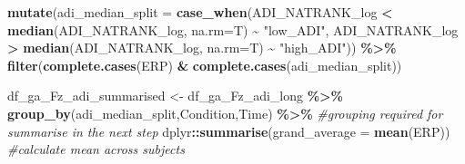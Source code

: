\documentclass[
]{article}
\newenvironment{Shaded}{\begin{snugshade}}{\end{snugshade}}
\newcommand{\AttributeTok}[1]{\textcolor[rgb]{0.13,0.29,0.53}{#1}}
\newcommand{\CommentTok}[1]{\textcolor[rgb]{0.56,0.35,0.01}{\textit{#1}}}
\newcommand{\FunctionTok}[1]{\textcolor[rgb]{0.13,0.29,0.53}{\textbf{#1}}}
\newcommand{\NormalTok}[1]{#1}
\newcommand{\OtherTok}[1]{\textcolor[rgb]{0.56,0.35,0.01}{#1}}
\newcommand{\SpecialCharTok}[1]{\textcolor[rgb]{0.81,0.36,0.00}{\textbf{#1}}}
\newcommand{\StringTok}[1]{\textcolor[rgb]{0.31,0.60,0.02}{#1}}
\begin{document}
\begin{Shaded}
\begin{Highlighting}[]
  \FunctionTok{mutate}\NormalTok{(}\AttributeTok{adi\_median\_split =} \FunctionTok{case\_when}\NormalTok{(ADI\_NATRANK\_log }\SpecialCharTok{\textless{}} \FunctionTok{median}\NormalTok{(ADI\_NATRANK\_log, }\AttributeTok{na.rm=}\NormalTok{T) }\SpecialCharTok{\textasciitilde{}} \StringTok{"low\_ADI"}\NormalTok{,}
\NormalTok{                                       ADI\_NATRANK\_log }\SpecialCharTok{\textgreater{}} \FunctionTok{median}\NormalTok{(ADI\_NATRANK\_log, }\AttributeTok{na.rm=}\NormalTok{T) }\SpecialCharTok{\textasciitilde{}} \StringTok{"high\_ADI"}\NormalTok{)) }\SpecialCharTok{\%\textgreater{}\%}
  \FunctionTok{filter}\NormalTok{(}\FunctionTok{complete.cases}\NormalTok{(ERP) }\SpecialCharTok{\&} \FunctionTok{complete.cases}\NormalTok{(adi\_median\_split))}

\NormalTok{df\_ga\_Fz\_adi\_summarised }\OtherTok{\textless{}{-}}\NormalTok{ df\_ga\_Fz\_adi\_long }\SpecialCharTok{\%\textgreater{}\%}
  \FunctionTok{group\_by}\NormalTok{(adi\_median\_split,Condition,Time) }\SpecialCharTok{\%\textgreater{}\%} \CommentTok{\#grouping required for summarise in the next step}
\NormalTok{  dplyr}\SpecialCharTok{::}\FunctionTok{summarise}\NormalTok{(}\AttributeTok{grand\_average =} \FunctionTok{mean}\NormalTok{(ERP)) }\CommentTok{\#calculate mean across subjects}


\end{Highlighting}
\end{Shaded}
\end{document}
